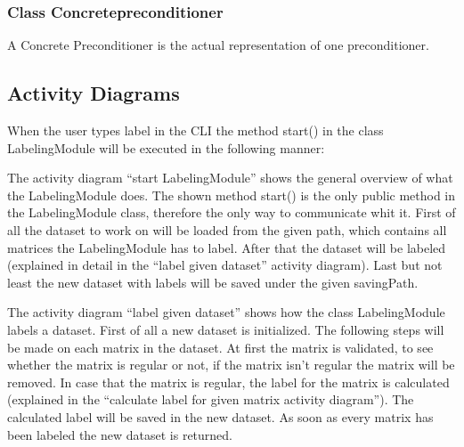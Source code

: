 \documentclass[parskip=full]{scrartcl}
\begin{document}
\subsubsection{Class Concrete\gls{preconditioner}}
A Concrete Preconditioner is the actual representation of one \gls{preconditioner}.

\newpage
\subsection{Activity Diagrams}
When the user types label in the \gls{CLI} the method start() in the class LabelingModule will be executed in the following manner:

\begin{figure}[h]
\begin{center}

\label{Activity Diagrams}
\end{center}
\end{figure}
\newpage


The activity diagram ``start LabelingModule'' shows the general overview of what the LabelingModule does.
The shown method start() is the only public method in the LabelingModule class, therefore the only way to communicate whit it.
First of all the dataset to work on will be loaded from the given path, which contains all matrices the LabelingModule has to label.
After that the dataset will be labeled (explained in detail in the ``label given dataset'' activity diagram).
Last but not least the new dataset with \glspl{label} will be saved under the given savingPath.


\begin{figure}[h]
\begin{center}

\label{Activity Diagrams}
\end{center}
\end{figure}
\newpage


The activity diagram ``label given dataset'' shows how the class LabelingModule labels a dataset.
First of all a new dataset is initialized.
The following steps will be made on each matrix in the dataset.
At first the matrix is validated, to see whether the matrix is regular or not, if the matrix isn't regular the matrix will be removed.
In case that the matrix is regular, the \gls{label} for the matrix is calculated (explained in the ``calculate label for given matrix activity diagram'').
The calculated \gls{label} will be saved in the new dataset.
As soon as every matrix has been labeled the new dataset is returned.
\end{document}
